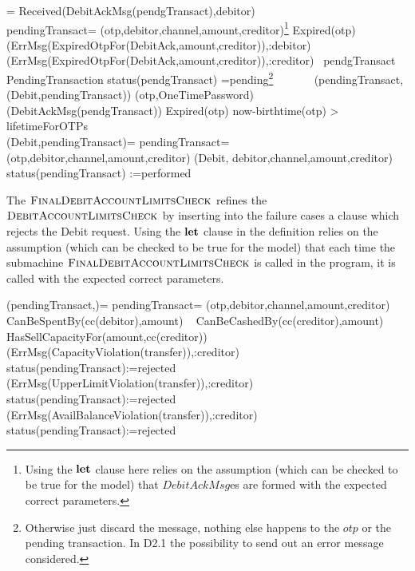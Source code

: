 \begin{asm}  
 =\+           
\IF Received(DebitAckMsg(pendgTransact),\FROM debitor) \THEN \\
 \LET pendingTransact= (otp,debitor,channel,amount,creditor)\footnote{Using the $\mathrel{\mathbf{let}}$ clause here relies on the assumption (which can be checked to be true for the model) that $DebitAckMsg$es are formed with the expected correct parameters.}\+
  \IF Expired(otp) \THEN \+
    (ErrMsg(ExpiredOtpFor(DebitAck,amount,creditor)),\TO :debitor) \\
    (ErrMsg(ExpiredOtpFor(DebitAck,amount,creditor)),\TO :creditor)\- 
  \ELSE ~\IF pendgTransact  \in PendingTransaction \AND
    status(pendgTransact) =pending\footnote{Otherwise just discard the message, nothing else happens to the $otp$ or the pending transaction. In D2.1 the possibility to send out an error message considered.}  \+
       \THEN \+
          \+
              ~~~~~~ (pendingTransact,(Debit,pendingTransact))\-
                (otp,OneTimePassword)\dec\dec\-  
(DebitAckMsg(pendgTransact)) \dec\-
\WHERE \+
Expired(otp) \IFF now-birthtime(otp) > lifetimeForOTPs\\
(Debit,pendingTransact)=\+
  \LET pendingTransact=(otp,debitor,channel,amount,creditor)\+
  (Debit, debitor,channel,amount,creditor)\\
  status(pendingTransact) :=performed
\end{asm}

The $\hbox{\sc FinalDebitAccountLimitsCheck}$ refines the  $\hbox{\sc DebitAccountLimitsCheck}$ by inserting into the failure cases a clause which rejects the Debit request. Using the $\mathrel{\mathbf{let}}$ clause in the definition relies on the assumption (which can be checked to be true for the model) that each time the submachine $\hbox{\sc FinalDebitAccountLimitsCheck}$ is called in the program, it is called with the expected correct parameters.

\begin{asm}
(pendingTransact,)=\+
  \LET pendingTransact= (otp,debitor,channel,amount,creditor)\\
  \IF CanBeSpentBy(cc(debitor),amount) \+
    \THEN ~ \IF CanBeCashedBy(cc(creditor),amount) \+
      \THEN ~ \IF HasSellCapacityFor(amount,cc(creditor)) \+
         \THEN ~  \\
         \ELSE \+
           (ErrMsg(CapacityViolation(transfer)),\TO :creditor)\\
            status(pendingTransact):=rejected \dec\-
     \ELSE \+
    (ErrMsg(UpperLimitViolation(transfer)),\TO :creditor)\\
     status(pendingTransact):=rejected \dec\-
  \ELSE \+
   (ErrMsg(AvailBalanceViolation(transfer)),\TO :creditor)\\
  status(pendingTransact):=rejected
\end{asm}


